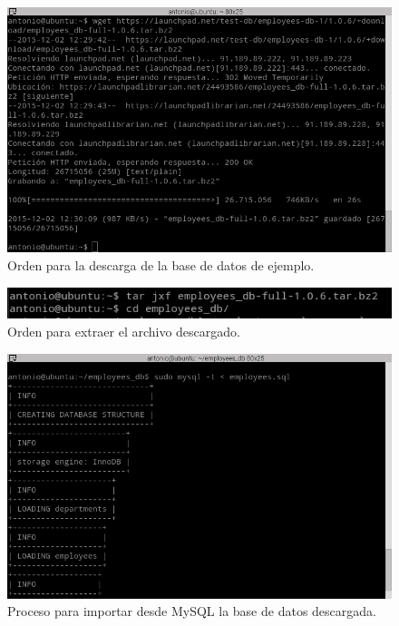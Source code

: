 \begin{figure}[H]
  \begin{center}
    \includegraphics[width=1\textwidth]{imagenes/descarga}
    \caption{Orden para la descarga de la base de datos de ejemplo.}
    \label{fig22}
  \end{center}
\end{figure}

\begin{figure}[H]
  \begin{center}
    \includegraphics[width=1\textwidth]{imagenes/extraccion}
    \caption{Orden para extraer el archivo descargado.}
    \label{fig23}
  \end{center}
\end{figure}

\begin{figure}[H]
  \begin{center}
    \includegraphics[width=1\textwidth]{imagenes/importacion}
    \caption{Proceso para importar desde MySQL la base de datos descargada.}
    \label{fig24}
  \end{center}
\end{figure}

